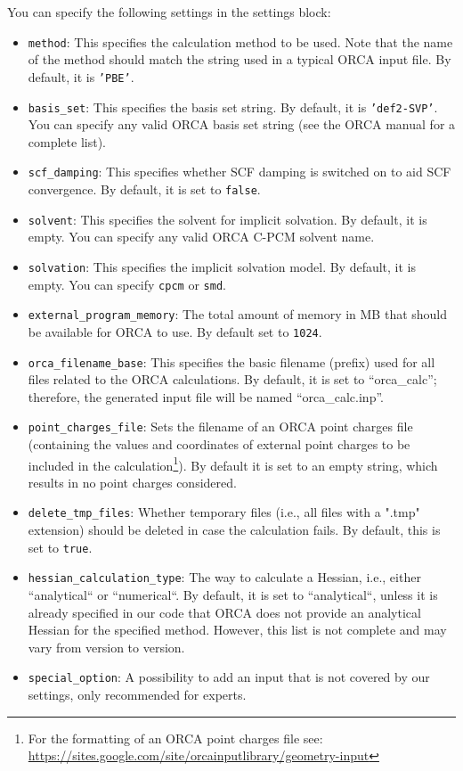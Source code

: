 \documentclass[]{tufte-book}
\begin{document}
You can specify the following settings in the settings block:
\begin{itemize}
\item \texttt{method}: This specifies the calculation method to be used.
Note that the name of the method should match the string used in a typical \textsc{ORCA} input file.
By default, it is \texttt{'PBE'}.
\item \texttt{basis\_set}: This specifies the basis set string. By default, it is \texttt{'def2-SVP'}. You can specify
any valid ORCA basis set string (see the \textsc{ORCA} manual for a complete list).
\item \texttt{scf\_damping}: This specifies whether SCF damping is switched on to aid SCF convergence. By default, it is set to \texttt{false}.
\item \texttt{solvent}: This specifies the solvent for implicit solvation. By default, it is empty. You can specify any valid \textsc{ORCA} C-PCM solvent name.
\item \texttt{solvation}: This specifies the implicit solvation model. By default, it is empty. You can specify \texttt{cpcm} or \texttt{smd}.
\item \texttt{external\_program\_memory}: The total amount of memory in MB that should be available for \textsc{ORCA} to use.
By default set to \texttt{1024}.
\item \texttt{orca\_filename\_base}: This specifies the basic filename (prefix) used for all files related to the \textsc{ORCA} calculations.
By default, it is set to ``orca\_calc''; therefore, the generated input file will be named ``orca\_calc.inp''.
\item \texttt{point\_charges\_file}: Sets the filename of an \textsc{ORCA} point charges file (containing the values and coordinates of
external point charges to be included in the calculation\footnote{For the formatting of an \textsc{ORCA} point charges file see: \url{https://sites.google.com/site/orcainputlibrary/geometry-input}}).
By default it is set to an empty string, which results
in no point charges considered.
\item \texttt{delete\_tmp\_files}: Whether temporary files (i.e., all files with a ".tmp" extension) should be deleted in case
the calculation fails. By default, this is set to \texttt{true}.
\item \texttt{hessian\_calculation\_type}: The way to calculate a Hessian, i.e., either ``analytical`` or ``numerical``. By default, it is set to ``analytical``, unless it is already specified in our code that \textsc{ORCA} does not provide an analytical Hessian for the specified method. However, this list is not complete and may vary from version to version.
\item \texttt{special\_option}: A possibility to add an input that is not covered by our settings, only recommended for experts.
\end{itemize}
\end{document}

